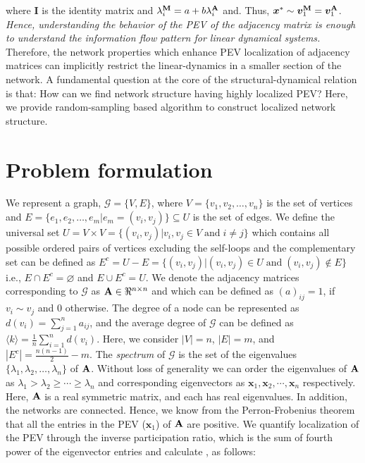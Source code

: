 \documentclass[envcountreset,oribibl]{llncs}
\begin{document}
where {\bf I} is the identity matrix and $\lambda_i^{\bf M}=a+b\lambda_i^{\bf A}$ and. Thus, $\bm{x}^{*} \sim  \bm{v}_1^{\bf M}=\bm{v}_1^{\bf A}$. {\em Hence, understanding the behavior of the PEV of the adjacency matrix is enough to understand the information flow pattern for linear dynamical systems.} Therefore, the network properties which enhance PEV localization of adjacency matrices can implicitly restrict the linear-dynamics in a smaller section of the network. A fundamental question at the core of the structural-dynamical relation is that: How can we find network structure having highly localized PEV? Here, we provide random-sampling based algorithm to construct localized network structure. 

\section{Problem formulation}
We represent a graph, $\mathcal{G} =\{V,E\}$, where $V=\{v_1, v_2,\ldots,v_n\}$ is the set of vertices and $E=\{e_1, e_2,\ldots,e_{m}|e_{m}=(v_i, v_j)\} \subseteq U$ is the set of edges. We define the universal set $U = V \times V=\{(v_i, v_j)| v_i, v_j \in V\; \text{and}\; i \neq j\}$ which contains all possible ordered pairs of vertices excluding the self-loops and the complementary set can be defined as $E^c = U - E=\{(v_i, v_j)| (v_i, v_j) \in U\; \text{and}\; (v_i, v_j) \notin E\}$ i.e., $E\cap E^c=\varnothing $ and $E \cup E^c= U$. We denote the adjacency matrices corresponding to $\mathcal{G}$  as ${\bf A} \in \Re^{n \times n}$ and which can be defined as $(a)_{ij} = 1$, if  $v_i \sim v_j$ and $0$ otherwise.
The degree of a node can be represented as $d(v_i)=\sum_{j=1}^n a_{ij}$, and the average degree of $\mathcal{G}$ can be defined as $\langle k \rangle = \frac{1}{n}\sum_{i=1}^n d(v_i)$. Here, we consider $|V|=n$, $|E|=m$, and $|E^c|=\frac{n(n-1)}{2}-m$.  
The \textit{spectrum} of $\mathcal{G}$ is the set of the eigenvalues $\{\lambda_1, \lambda_2, \ldots, \lambda_n\}$ of ${\bf A}$. Without loss of generality we can order the eigenvalues of ${\bf A}$ as $\lambda_1 > \lambda_2 \geq \cdots \geq \lambda_n$ and corresponding eigenvectors as $\bm{x}_1, \bm{x}_2, \cdots, \bm{x}_n$ respectively. Here, ${\bf A}$ is a real symmetric matrix, and each has real eigenvalues. In addition, the networks are connected. Hence, we know from the Perron-Frobenius theorem \cite{miegham_book2011} that all the entries in the PEV ($\bm{x}_1$) of ${\bf A}$ are positive. We quantify localization of the PEV through the inverse participation ratio, which is the sum of fourth power of the eigenvector entries and calculate \cite{Goltsev_prl2012}, \cite{evec_localization_2017} as follows:
\end{document}
